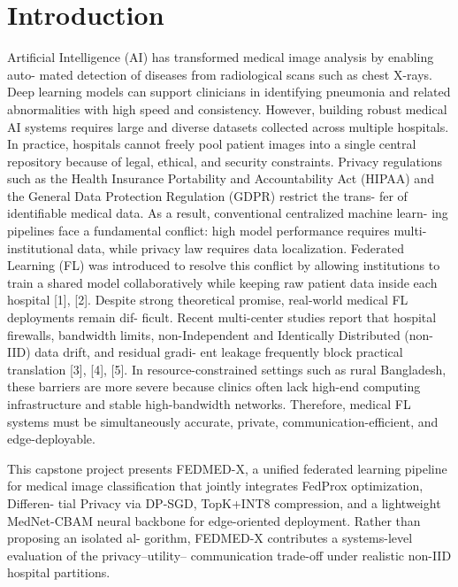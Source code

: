\documentclass[12pt,a4paper]{report}
\begin{document}
\chapter{Introduction}
Artificial Intelligence (AI) has transformed medical image analysis by enabling auto- mated detection of diseases from radiological scans such as chest X-rays. Deep learning models can support clinicians in identifying pneumonia and related abnormalities with high speed and consistency. However, building robust medical AI systems requires large and diverse datasets collected across multiple hospitals. In practice, hospitals cannot freely pool patient images into a single central repository because of legal, ethical, and security constraints.
Privacy regulations such as the Health Insurance Portability and Accountability
Act (HIPAA) and the General Data Protection Regulation (GDPR) restrict the trans- fer of identifiable medical data. As a result, conventional centralized machine learn- ing pipelines face a fundamental conflict:
high model performance requires multi- institutional data, while privacy law requires data localization.
Federated Learning (FL) was introduced to resolve this conflict by allowing institutions to train a shared model collaboratively while keeping raw patient data inside each hospital [1], [2].
Despite strong theoretical promise, real-world medical FL deployments remain dif- ficult.
Recent multi-center studies report that hospital firewalls, bandwidth limits, non-Independent and Identically Distributed (non-IID) data drift, and residual gradi- ent leakage frequently block practical translation [3], [4], [5]. In resource-constrained settings such as rural Bangladesh, these barriers are more severe because clinics often lack high-end computing infrastructure and stable high-bandwidth networks. Therefore, medical FL systems must be simultaneously accurate, private, communication-efficient, and edge-deployable.

This capstone project presents FEDMED-X, a unified federated learning pipeline for medical image classification that jointly integrates FedProx optimization, Differen- tial Privacy via DP-SGD, TopK+INT8 compression, and a lightweight MedNet-CBAM neural backbone for edge-oriented deployment. Rather than proposing an isolated al- gorithm, FEDMED-X contributes a systems-level evaluation of the privacy–utility– communication trade-off under realistic non-IID hospital partitions.
\end{document}
